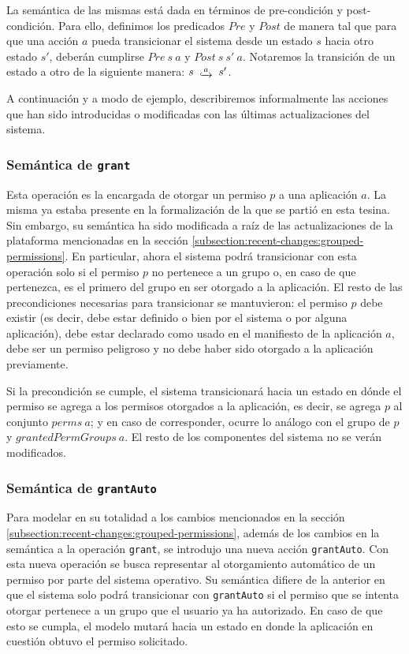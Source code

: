 La semántica de las mismas está dada en términos de pre-condición y post-condición. Para ello,
definimos los predicados $Pre$ y $Post$ de manera tal que para que una acción $a$ pueda transicionar
el sistema desde un estado $s$ hacia otro estado $s'$, deberán cumplirse $Pre\ s\ a$ y $Post\ s\ s'\
    a$. Notaremos la transición de un estado a otro de la siguiente manera: $s\ \step{a}\ s'$.

A continuación y a modo de ejemplo, describiremos informalmente las acciones que han sido
introducidas o modificadas con las últimas actualizaciones del sistema.

\subsubsection{Semántica de \texttt{grant}}

Esta operación es la encargada de otorgar un permiso $p$ a una aplicación $a$. La misma ya estaba
presente en la formalización de la que se partió en esta tesina. Sin embargo, su semántica ha sido
modificada a raíz de las actualizaciones de la plataforma mencionadas en la sección
\ref{subsection:recent-changes:grouped-permissions}. En particular, ahora el sistema podrá
transicionar con esta operación solo si  el permiso $p$ no pertenece a un grupo o, en caso de que
pertenezca, es el primero del grupo en ser otorgado a la aplicación. El resto de las precondiciones
necesarias para transicionar se mantuvieron: el permiso $p$ debe existir (es decir, debe estar
definido o bien por el sistema o por alguna aplicación), debe estar declarado como usado en el
manifiesto de la aplicación $a$, debe ser un permiso peligroso y no debe haber sido otorgado a la
aplicación previamente.

Si la precondición se cumple, el sistema transicionará hacia un estado en dónde el permiso se agrega
a los permisos otorgados a la aplicación, es decir, se agrega $p$ al conjunto $perms\ a$; y en caso
de corresponder, ocurre lo análogo con el grupo de $p$ y $grantedPermGroups\ a$. El resto de los
componentes del sistema no se verán modificados.

\subsubsection{Semántica de \texttt{grantAuto}}

Para modelar en su totalidad a los cambios mencionados en la sección
\ref{subsection:recent-changes:grouped-permissions}, además de los cambios en la semántica a la
operación \texttt{grant}, se introdujo una nueva acción \texttt{grantAuto}. Con esta nueva operación
se busca representar al otorgamiento automático de un permiso por parte del sistema operativo. Su
semántica difiere de la anterior en que el sistema solo podrá transicionar con \texttt{grantAuto} si
el permiso que se intenta otorgar pertenece a un grupo que el usuario ya ha autorizado. En caso de
que esto se cumpla, el modelo mutará hacia un estado en donde la aplicación en cuestión obtuvo el
permiso solicitado.

